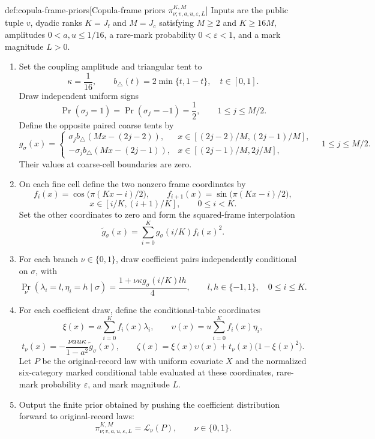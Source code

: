 \begin{algorithmv}{def:copula-frame-priors}[Copula-frame priors \(\pi^{K,M}_{\nu;v,a,u,\varepsilon,L}\)]
Inputs are the public tuple \(v\), dyadic ranks \(K=J_{\mathrm f}\) and \(M=J_{\mathrm c}\) satisfying \(M\ge2\) and \(K\ge16M\), amplitudes \(0<a,u\le1/16\), a rare-mark probability \(0<\varepsilon<1\), and a mark magnitude \(L>0\).
\begin{enumerate}
\item Set the coupling amplitude and triangular tent to
\[
\kappa=\frac1{16},
\qquad
b_\triangle(t)=2\min\{t,1-t\},
\quad t\in[0,1].
\]
Draw independent uniform signs
\[
\Pr(\sigma_j=1)=\Pr(\sigma_j=-1)=\frac12,
\qquad 1\le j\le M/2.
\]
Define the opposite paired coarse tents by
\[
g_\sigma(x)=
\begin{cases}
\sigma_j b_\triangle(Mx-(2j-2)),
&x\in[(2j-2)/M,(2j-1)/M],\\
-\sigma_j b_\triangle(Mx-(2j-1)),
&x\in[(2j-1)/M,2j/M],
\end{cases}
\quad 1\le j\le M/2.
\]
Their values at coarse-cell boundaries are zero.
\item On each fine cell define the two nonzero frame coordinates by
\[
f_i(x)=\cos\!\bigl(\pi(Kx-i)/2\bigr),
\qquad
f_{i+1}(x)=\sin\!\bigl(\pi(Kx-i)/2\bigr),
\]
\[
x\in[i/K,(i+1)/K],
\qquad 0\le i<K.
\]
Set the other coordinates to zero and form the squared-frame interpolation
\[
\widetilde g_\sigma(x)
=
\sum_{i=0}^{K}g_\sigma(i/K)f_i(x)^2.
\]
\item For each branch \(\nu\in\{0,1\}\), draw coefficient pairs independently conditional on \(\sigma\), with
\[
\Pr_\nu(\lambda_i=l,\eta_i=h\mid\sigma)
=
\frac{1+\nu\kappa g_\sigma(i/K)lh}{4},
\qquad
l,h\in\{-1,1\},
\quad 0\le i\le K.
\]
\item For each coefficient draw, define the conditional-table coordinates
\[
\xi(x)=a\sum_{i=0}^{K}f_i(x)\lambda_i,
\qquad
\upsilon(x)=u\sum_{i=0}^{K}f_i(x)\eta_i,
\]
\[
t_\nu(x)=
-\frac{\nu au\kappa}{1-a^2}\widetilde g_\sigma(x),
\qquad
\zeta(x)=
\xi(x)\upsilon(x)+t_\nu(x)\bigl(1-\xi(x)^2\bigr).
\]
Let \(P\) be the original-record law with uniform covariate \(X\) and the normalized six-category marked conditional table evaluated at these coordinates, rare-mark probability \(\varepsilon\), and mark magnitude \(L\).
\item Output the finite prior obtained by pushing the coefficient distribution forward to original-record laws:
\[
\pi^{K,M}_{\nu;v,a,u,\varepsilon,L}
=
\mathcal L_\nu(P),
\qquad \nu\in\{0,1\}.
\]
\end{enumerate}
\end{algorithmv}

